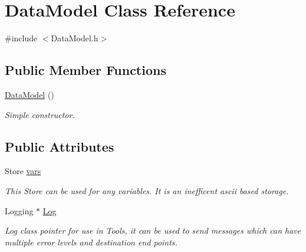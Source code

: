 \hypertarget{classDataModel}{\section{Data\-Model Class Reference}
\label{classDataModel}
}


{\ttfamily \#include $<$Data\-Model.\-h$>$}

\subsection*{Public Member Functions}
\begin{DoxyCompactItemize}
\item 
\hypertarget{classDataModel_abff03aef2cb531142a35781bb87c3365}{\hyperlink{classDataModel_abff03aef2cb531142a35781bb87c3365}{Data\-Model} ()}\label{classDataModel_abff03aef2cb531142a35781bb87c3365}

\begin{DoxyCompactList}\small\item\em Simple constructor. \end{DoxyCompactList}\end{DoxyCompactItemize}
\subsection*{Public Attributes}
\begin{DoxyCompactItemize}
\item 
\hypertarget{classDataModel_a4baac5fe364a7a23762d70d2c2216486}{Store \hyperlink{classDataModel_a4baac5fe364a7a23762d70d2c2216486}{vars}}\label{classDataModel_a4baac5fe364a7a23762d70d2c2216486}

\begin{DoxyCompactList}\small\item\em This Store can be used for any variables. It is an inefficent ascii based storage. \end{DoxyCompactList}\item 
\hypertarget{classDataModel_aa777da4c632e4659ee5b1447ad513458}{Logging $\ast$ \hyperlink{classDataModel_aa777da4c632e4659ee5b1447ad513458}{Log}}\label{classDataModel_aa777da4c632e4659ee5b1447ad513458}

\begin{DoxyCompactList}\small\item\em Log class pointer for use in Tools, it can be used to send messages which can have multiple error levels and destination end points. \end{DoxyCompactList}\end{DoxyCompactItemize}


